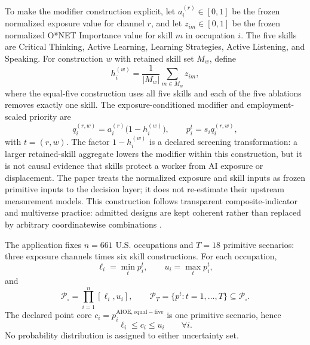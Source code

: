 \documentclass[conference]{IEEEtran}
\begin{document}
To make the modifier construction explicit, let $a_i^{(r)}\in[0,1]$ be the frozen normalized exposure value for channel $r$, and let $z_{im}\in[0,1]$ be the frozen normalized O*NET Importance value for skill $m$ in occupation $i$. The five skills are Critical Thinking, Active Learning, Learning Strategies, Active Listening, and Speaking. For construction $w$ with retained skill set $M_w$, define
\begin{equation}
h_i^{(w)}=\frac{1}{|M_w|}\sum_{m\in M_w}z_{im},
\label{eq:hac}
\end{equation}
where the equal-five construction uses all five skills and each of the five ablations removes exactly one skill. The exposure-conditioned modifier and employment-scaled priority are
\begin{equation}
q_i^{(r,w)}=a_i^{(r)}\bigl(1-h_i^{(w)}\bigr),\qquad
p_i^t=s_iq_i^{(r,w)},
\label{eq:priority}
\end{equation}
with $t=(r,w)$. The factor $1-h_i^{(w)}$ is a declared screening transformation: a larger retained-skill aggregate lowers the modifier within this construction, but it is not causal evidence that skills protect a worker from AI exposure or displacement. The paper treats the normalized exposure and skill inputs as frozen primitive inputs to the decision layer; it does not re-estimate their upstream measurement models. This construction follows transparent composite-indicator and multiverse practice: admitted designs are kept coherent rather than replaced by arbitrary coordinatewise combinations \cite{oecd2008,manski2003,greco2008,steegen2016,simonsohn2020}.

The application fixes $n=661$ U.S. occupations and $T=18$ primitive scenarios: three exposure channels times six skill constructions. For each occupation,
\begin{equation}
\ell_i=\min_t p_i^t,\qquad u_i=\max_t p_i^t,
\label{eq:bounds}
\end{equation}
and
\begin{equation}
\mathcal P_{\square}=\prod_{i=1}^n[\ell_i,u_i],\qquad
\mathcal P_T=\{p^t:t=1,\ldots,T\}\subseteq\mathcal P_{\square}.
\end{equation}
The declared point core $c_i=p_i^{\mathrm{AIOE,equal-five}}$ is one primitive scenario, hence
\begin{equation}
\ell_i\le c_i\le u_i\qquad \forall i.
\label{eq:coreinside}
\end{equation}
No probability distribution is assigned to either uncertainty set.
\end{document}
